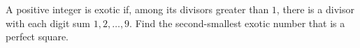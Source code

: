 A positive integer is exotic if, among its divisors greater than $1$, there is a divisor with each digit sum $1,2,\ldots,9$. Find the second-smallest exotic number that is a perfect square.
